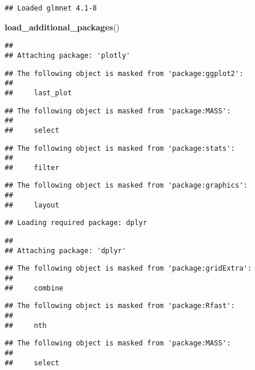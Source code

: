 \documentclass[
]{article}
\newenvironment{Shaded}{\begin{snugshade}}{\end{snugshade}}
\newcommand{\FunctionTok}[1]{\textcolor[rgb]{0.13,0.29,0.53}{\textbf{#1}}}
\newcommand{\NormalTok}[1]{#1}
\begin{document}
\begin{verbatim}
## Loaded glmnet 4.1-8
\end{verbatim}

\begin{Shaded}
\begin{Highlighting}[]
\FunctionTok{load\_additional\_packages}\NormalTok{()}
\end{Highlighting}
\end{Shaded}

\begin{verbatim}
## 
## Attaching package: 'plotly'
\end{verbatim}

\begin{verbatim}
## The following object is masked from 'package:ggplot2':
## 
##     last_plot
\end{verbatim}

\begin{verbatim}
## The following object is masked from 'package:MASS':
## 
##     select
\end{verbatim}

\begin{verbatim}
## The following object is masked from 'package:stats':
## 
##     filter
\end{verbatim}

\begin{verbatim}
## The following object is masked from 'package:graphics':
## 
##     layout
\end{verbatim}

\begin{verbatim}
## Loading required package: dplyr
\end{verbatim}

\begin{verbatim}
## 
## Attaching package: 'dplyr'
\end{verbatim}

\begin{verbatim}
## The following object is masked from 'package:gridExtra':
## 
##     combine
\end{verbatim}

\begin{verbatim}
## The following object is masked from 'package:Rfast':
## 
##     nth
\end{verbatim}

\begin{verbatim}
## The following object is masked from 'package:MASS':
## 
##     select
\end{verbatim}
\end{document}
